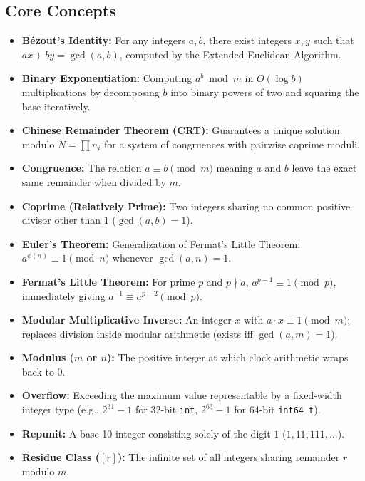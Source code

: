\documentclass[11pt,a4paper]{article}
\theoremstyle{definition}
\begin{document}
\subsection*{Core Concepts}
\begin{itemize}
    \item \textbf{B\'{e}zout's Identity:} For any integers $a, b$, there exist integers $x, y$ such that $ax + by = \gcd(a, b)$, computed by the Extended Euclidean Algorithm.
    \item \textbf{Binary Exponentiation:} Computing $a^b \bmod m$ in $O(\log b)$ multiplications by decomposing $b$ into binary powers of two and squaring the base iteratively.
    \item \textbf{Chinese Remainder Theorem (CRT):} Guarantees a unique solution modulo $N = \prod n_i$ for a system of congruences with pairwise coprime moduli.
    \item \textbf{Congruence:} The relation $a \equiv b \pmod m$ meaning $a$ and $b$ leave the exact same remainder when divided by $m$.
    \item \textbf{Coprime (Relatively Prime):} Two integers sharing no common positive divisor other than $1$ ($\gcd(a, b) = 1$).
    \item \textbf{Euler's Theorem:} Generalization of Fermat's Little Theorem: $a^{\phi(n)} \equiv 1 \pmod n$ whenever $\gcd(a, n) = 1$.
    \item \textbf{Fermat's Little Theorem:} For prime $p$ and $p \nmid a$, $a^{p-1} \equiv 1 \pmod p$, immediately giving $a^{-1} \equiv a^{p-2} \pmod p$.
    \item \textbf{Modular Multiplicative Inverse:} An integer $x$ with $a \cdot x \equiv 1 \pmod m$; replaces division inside modular arithmetic (exists iff $\gcd(a, m) = 1$).
    \item \textbf{Modulus ($m$ or $n$):} The positive integer at which clock arithmetic wraps back to $0$.
    \item \textbf{Overflow:} Exceeding the maximum value representable by a fixed-width integer type (e.g., $2^{31}-1$ for 32-bit \texttt{int}, $2^{63}-1$ for 64-bit \texttt{int64\_t}).
    \item \textbf{Repunit:} A base-10 integer consisting solely of the digit $1$ ($1, 11, 111, \dots$).
    \item \textbf{Residue Class ($[r]$):} The infinite set of all integers sharing remainder $r$ modulo $m$.
\end{itemize}
\end{document}
